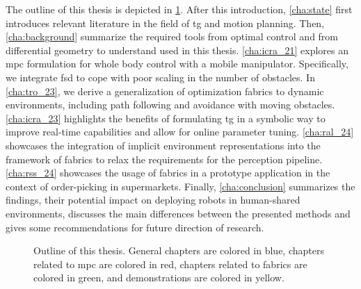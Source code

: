 The outline of this thesis is depicted in \cref{fig:outline}.
After this introduction, \cref{cha:state} first introduces
relevant literature in the field of \ac{tg}
and motion planning.
Then, \cref{cha:background} summarize the required tools
from optimal control and from differential geometry to
understand used in this thesis.
\cref{cha:icra_21} explores an \ac{mpc}
formulation for whole body control
with a mobile manipulator. Specifically, we integrate
\acl{fsd} to cope with poor scaling in the number of
obstacles.
In \cref{cha:tro_23}, we derive a
generalization of optimization fabrics to dynamic
environments, including path following and avoidance with
moving obstacles.
\cref{cha:icra_23} highlights the benefits of
formulating \ac{tg} in a symbolic way to
improve real-time capabilities and allow for online
parameter tuning.
\cref{cha:ral_24} showcases the integration of
implicit environment representations into the framework of
\ac{fabrics} to relax the requirements for the
perception pipeline.
\cref{cha:rss_24} showcases the 
usage of \ac{fabrics} in a prototype application in the
context of order-picking in supermarkets.
Finally,
\cref{cha:conclusion} summarizes the findings, their potential impact
on deploying robots in human-shared environments, discusses
the main differences between the presented methods and gives some
recommendations for future direction of research.
%
\begin{figure}[ht]
  \begin{center}
    
  \end{center}
  \caption{Outline of this thesis. General chapters are
  colored in blue, chapters related to \ac{mpc} are colored
  in red, chapters related to \ac{fabrics} are colored in 
  green, and demonstrations are colored in yellow.}
  \label{fig:outline}
\end{figure}
%



